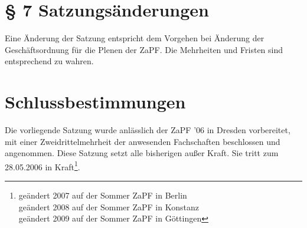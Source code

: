 \section*{§ 7 Satzungsänderungen}
Eine Änderung der Satzung entspricht dem Vorgehen bei Änderung der Geschäftsordnung für die Plenen der ZaPF.
Die Mehrheiten und Fristen sind entsprechend zu wahren.

\section*{Schlussbestimmungen}
Die vorliegende Satzung wurde anlässlich der ZaPF '06 in Dresden vorbereitet, mit einer Zweidrittelmehrheit der
anwesenden Fachschaften beschlossen und angenommen. Diese Satzung setzt alle bisherigen außer Kraft. Sie tritt zum
28.05.2006 in Kraft\footnote{ geändert 2007 auf der Sommer ZaPF in Berlin\\geändert 2008 auf der Sommer ZaPF in Konstanz\\geändert 2009 auf der Sommer ZaPF in
Göttingen}.


